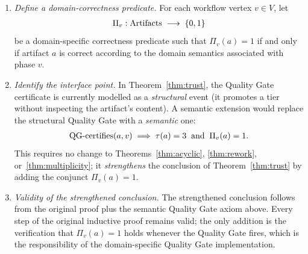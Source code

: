 \documentclass[12pt]{article}
\theoremstyle{definition}
\begin{document}
\begin{enumerate}
    \item \emph{Define a domain-correctness predicate.}
          For each workflow vertex $v \in V$, let
          \begin{align}
              \Pi_v : \mathrm{Artifacts} \;\longrightarrow\; \{0, 1\}
              \notag
          \end{align}
          be a domain-specific correctness predicate such that
          $\Pi_v(a) = 1$ if and only if artifact $a$ is correct
          according to the domain semantics associated with phase $v$.

    \item \emph{Identify the interface point.}
          In Theorem~\ref{thm:trust}, the Quality Gate certificate
          is currently modelled as a \emph{structural} event (it
          promotes a tier without inspecting the artifact's content).
          A semantic extension would replace the structural Quality
          Gate with a \emph{semantic} one:
          \begin{align}
              \text{QG-certifies}(a, v)
              \;\Longrightarrow\;
              \tau(a) = 3
              \;\;\text{and}\;\;
              \Pi_v(a) = 1.
              \notag
          \end{align}
          This requires no change to Theorems~\ref{thm:acyclic},
          \ref{thm:rework}, or~\ref{thm:multiplicity}; it
          \emph{strengthens} the conclusion of
          Theorem~\ref{thm:trust} by adding the conjunct
          $\Pi_v(a) = 1$.

    \item \emph{Validity of the strengthened conclusion.}
          The strengthened conclusion follows from the original proof
          plus the semantic Quality Gate axiom above.  Every step of
          the original inductive proof remains valid; the only
          addition is the verification that $\Pi_v(a) = 1$ holds
          whenever the Quality Gate fires, which is the responsibility
          of the domain-specific Quality Gate implementation.


\end{enumerate}
\end{document}
